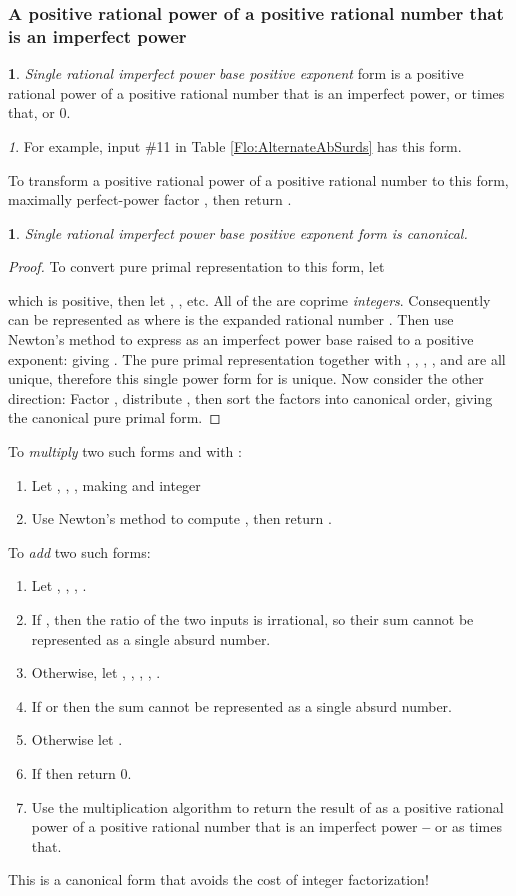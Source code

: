 \documentclass[12pt,english]{article}
\theoremstyle{definition}
\newtheorem*{defn*}{\protect\definitionname}
\theoremstyle{remark}
\newtheorem*{rem*}{\protect\remarkname}
\theoremstyle{plain}
\theoremstyle{plain}
\newtheorem{prop}[thm]{\protect\propositionname}
\providecommand{\definitionname}{Definition}
\providecommand{\propositionname}{Proposition}
\providecommand{\remarkname}{Remark}
\begin{document}
\subsubsection{A positive rational power of a positive rational number that is an
imperfect power\emph{\vspace{0.3em}
}}
\begin{defn*}
\textsl{Single rational imperfect power base positive exponent} form
is a positive rational power of a positive rational number that is
an imperfect power, or {\small } times that, or 0.\end{defn*}
\begin{rem*}
For example, input \#11 in Table \ref{Flo:AlternateAbSurds} has this
form.
\end{rem*}
To transform a positive rational power  of a positive rational
number  to this form, maximally perfect-power factor ,
then return .
\begin{prop}
\textsl{Single rational imperfect power base positive exponent form}
is canonical.\end{prop}
\begin{proof}
To convert pure primal representation 
to this form, let

which is positive, then let , ,
etc. All of the  are coprime \textsl{integers}. Consequently
 can be represented as  where  is the expanded
rational number . Then use Newton's
method to express  as an imperfect power base raised to a positive
exponent:  giving .
The pure primal representation together with , ,
, ,  and  are all unique, therefore
this single power form for  is unique. Now consider the other
direction: Factor , distribute , then
sort the factors into canonical order, giving the canonical pure primal
form.
\end{proof}
To \textsl{multiply} two such forms  and
 with :
\begin{enumerate}
\item Let , ,
, making  and 
integer
\item Use Newton's method to compute ,
then return .
\end{enumerate}
To \textsl{add} two such forms:
\begin{enumerate}
\item Let , ,
, .
\item If , then the ratio of the two inputs is
irrational, so their sum cannot be represented as a single absurd
number.
\item Otherwise, let , ,
, 
, .
\item If  or 
then the sum cannot be represented as a single absurd number.
\item Otherwise let .
\item If  then return 0.
\item Use the multiplication algorithm to return the result of 
as a positive rational power of a positive rational number that is
an imperfect power \textbf{--} or as {\small } times that.
\end{enumerate}
This is a canonical form that avoids the cost of integer factorization!
\end{document}
